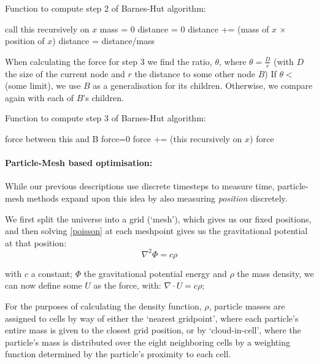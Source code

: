 \documentclass[11pt,a4paper]{article}
\begin{document}
\begin{algorithm}[H] 
\caption{Function to compute step 2 of Barnes-Hut algorithm:}
\begin{algorithmic}
  \RETURN
\ELSE 
  \STATE call this recursively on $x$
  \ENDFOR
\ENDIF
\STATE mass = 0
\STATE distance = 0
 \STATE distance += (mass of $x$ $\times$ position of $x$)
\ENDFOR
\STATE distance = distance/mass
\end{algorithmic}
\end{algorithm}

\noindent When calculating the force for step 3 we find the ratio, $\theta$, where $\theta = \frac{D}{r}$ (with $D$ the size of the current node and $r$ the distance to some other node $B$) If $\theta < $(some limit), we use $B$ as a generalisation for its children. Otherwise, we compare again with each of $B$'s children.

\begin{algorithm}[H]
\caption{Function to compute step 3 of Barnes-Hut algorithm:}
\begin{algorithmic}
  \RETURN force between this and B
\ELSE
 \STATE force=0
   \STATE force += (this recursively on $x$)
 \ENDFOR
 \RETURN force
\ENDIF
\end{algorithmic}
\end{algorithm}

\paragraph{Particle-Mesh based optimisation:}While our previous descriptions use discrete timesteps to measure time, particle-mesh methods expand upon this idea by also measuring \emph{position} discretely.

We first split the universe into a grid (`mesh'), which gives us our fixed positions, and then solving \ref{poisson} at each meshpoint gives us the gravitational potential at that position:
\begin{equation}
\nabla^2\Phi=c\rho
\label{poisson}
\end{equation}

\noindent with $c$ a constant; $\Phi$ the gravitational potential energy and $\rho$ the mass density, we can now define some $U$ as the force, with: $\nabla \cdot U = c\rho$; 

For the purposes of calculating the density function, $\rho$, particle masses are assigned to cells by way of either the `nearest gridpoint', where each particle's entire mass is given to the closest grid position, or by `cloud-in-cell', where the particle's mass is distributed over the eight neighboring cells by a weighting function determined by the particle's proximity to each cell.
\end{document}
